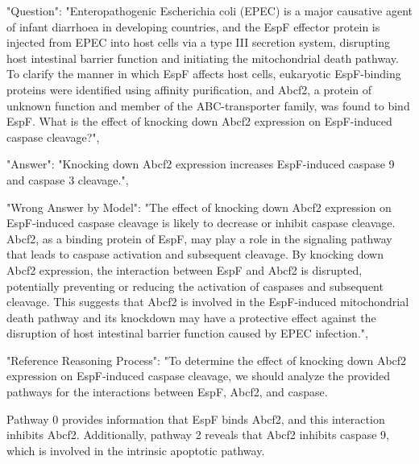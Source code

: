\begin{tcolorbox}[breakable]
"Question": "Enteropathogenic Escherichia coli (EPEC) is a major causative agent of infant diarrhoea in developing countries, and the EspF effector protein is injected from EPEC into host cells via a type III secretion system, disrupting host intestinal barrier function and initiating the mitochondrial death pathway. To clarify the manner in which EspF affects host cells, eukaryotic EspF-binding proteins were identified using affinity purification, and Abcf2, a protein of unknown function and member of the ABC-transporter family, was found to bind EspF. What is the effect of knocking down Abcf2 expression on EspF-induced caspase cleavage?",

"Answer": "Knocking down Abcf2 expression increases EspF-induced caspase 9 and caspase 3 cleavage.",



"Wrong Answer by Model": "The effect of knocking down Abcf2 expression on EspF-induced caspase cleavage is likely to decrease or inhibit caspase cleavage. Abcf2, as a binding protein of EspF, may play a role in the signaling pathway that leads to caspase activation and subsequent cleavage. By knocking down Abcf2 expression, the interaction between EspF and Abcf2 is disrupted, potentially preventing or reducing the activation of caspases and subsequent cleavage. This suggests that Abcf2 is involved in the EspF-induced mitochondrial death pathway and its knockdown may have a protective effect against the disruption of host intestinal barrier function caused by EPEC infection.",



"Reference Reasoning Process": "To determine the effect of knocking down Abcf2 expression on EspF-induced caspase cleavage, we should analyze the provided pathways for the interactions between EspF, Abcf2, and caspase.

Pathway 0 provides information that EspF binds Abcf2, and this interaction inhibits Abcf2. Additionally, pathway 2 reveals that Abcf2 inhibits caspase 9, which is involved in the intrinsic apoptotic pathway.


\end{tcolorbox}
